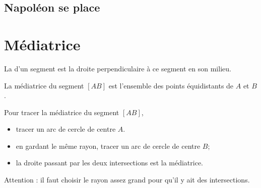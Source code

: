 
\subsection*{Napoléon se place}



\section{Médiatrice}

\begin{definition}
    La  d'un segment est la droite perpendiculaire à ce segment en son milieu.
\end{definition}

\begin{center}
   
\end{center}

\begin{Aretenir}
    La médiatrice du segment \( [AB]\) est l'ensemble des points équidistants de \( A\) et \( B\).
\end{Aretenir}

Pour tracer la médiatrice du segment \( [AB]\), 
\begin{itemize}
    \item tracer un arc de cercle de centre \( A\).
    \item en gardant le même rayon, tracer un arc de cercle de centre \( B\);
    \item la droite passant par les deux intersections est la médiatrice.
\end{itemize}
Attention : il faut choisir le rayon assez grand pour qu'il y ait des intersections.

\begin{center}
   
\end{center}

